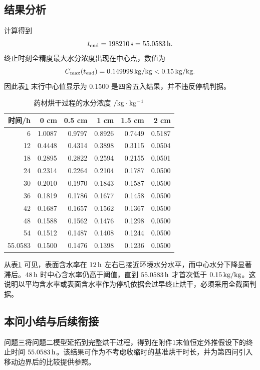 \documentclass[UTF8,a4paper,12pt]{ctexart}
\numberwithin{equation}{section}
\begin{document}
\subsection{结果分析}
计算得到
\begin{equation}
  t_{\rm end}=198210\rm\,s=55.0583\rm\,h.
\end{equation}
终止时刻全精度最大水分浓度出现在中心点，数值为
\begin{equation}
  C_{\max}(t_{\rm end})=0.149998\rm\,kg/kg<0.15\rm\,kg/kg.
\end{equation}
因此表\ref{tab:q3-moist} 末行中心值显示为 $0.1500$ 是四舍五入结果，并不违反停机判据。

\begin{table}[H]
  \centering
  \caption{药材烘干过程的水分浓度 $/\rm kg\cdot kg^{-1}$}
  \label{tab:q3-moist}
  \begin{tabular}{rrrrrr}
    \toprule
    时间/h & 0 cm & 0.5 cm & 1 cm & 1.5 cm & 2 cm\\ \midrule
    6 & 1.0087 & 0.9797 & 0.8926 & 0.7449 & 0.5187\\
    12 & 0.4448 & 0.4314 & 0.3898 & 0.3115 & 0.0504\\
    18 & 0.2895 & 0.2822 & 0.2594 & 0.2155 & 0.0501\\
    24 & 0.2314 & 0.2264 & 0.2104 & 0.1787 & 0.0500\\
    30 & 0.2010 & 0.1970 & 0.1843 & 0.1587 & 0.0500\\
    36 & 0.1819 & 0.1786 & 0.1677 & 0.1458 & 0.0500\\
    42 & 0.1687 & 0.1657 & 0.1562 & 0.1367 & 0.0500\\
    48 & 0.1588 & 0.1562 & 0.1476 & 0.1298 & 0.0500\\
    54 & 0.1512 & 0.1487 & 0.1408 & 0.1244 & 0.0500\\
    55.0583 & 0.1500 & 0.1476 & 0.1398 & 0.1236 & 0.0500\\
    \bottomrule
  \end{tabular}
\end{table}

从表\ref{tab:q3-moist} 可见，表面含水率在 $12\rm\,h$ 左右已接近环境水分水平，而中心水分下降显著滞后。$48\rm\,h$ 时中心含水率仍高于阈值，直到 $55.0583\rm\,h$ 才首次低于 $0.15\rm\,kg/kg$。这说明以平均含水率或表面含水率作为停机依据会过早终止烘干，必须采用全截面判据。

\subsection{本问小结与后续衔接}
问题三将问题二模型延拓到完整烘干过程，得到在附件1末值恒定外推假设下的终止时间 $55.0583\rm\,h$。该结果可作为不考虑收缩时的基准烘干时长，并为第四问引入移动边界后的比较提供参照。
\end{document}
